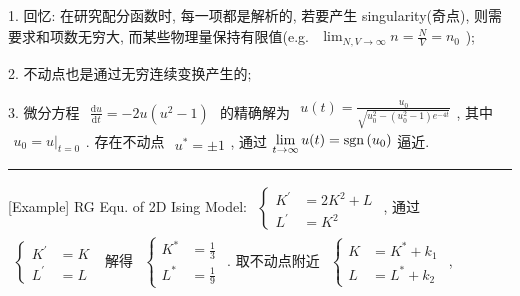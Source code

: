 \documentclass[../../main.tex]{subfiles}
\begin{document}
1. 回忆: 在研究配分函数时, 每一项都是解析的, 若要产生 singularity(奇点), 则需要求和项数无穷大, 而某些物理量保持有限值(e.g. $\begin{aligned}
    \lim_{N,V\rightarrow\infty}n = \frac{N}{V}= n_{0}
\end{aligned}$);

2. 不动点也是通过无穷连续变换产生的;

3. 微分方程 $\begin{aligned}
    \frac{\mathrm{d}u}{\mathrm{d}t} = -2u\left(u^{2}-1\right)
\end{aligned}$ 的精确解为 $\begin{aligned}
    u(t) = \frac{u_{0}}{\sqrt{u_{0}^{2}-(u_{0}^{2}-1)e^{-4t}}}
\end{aligned}$, 其中 $\begin{aligned}
    u_{0} = u\bigg|_{t=0}
\end{aligned}$. 存在不动点 $\begin{aligned}
    u^{*} = \pm 1
\end{aligned}$, 通过 $\begin{aligned}
    \lim_{t\rightarrow\infty}u(t) = \operatorname{sgn}{(u_{0})}
\end{aligned}$ 逼近. 

\vspace{0.5em}\hrule\vspace{0.5em}

[Example] RG Equ. of 2D Ising Model: $\begin{aligned}
    \left\{\begin{aligned}
        K^{\prime} &= 2K^{2} + L\\
        L^{\prime} &= K^{2}
    \end{aligned}\right.
\end{aligned}$, 通过 $\begin{aligned}
    \left\{\begin{aligned}
        K^{\prime} &= K\\
        L^{\prime} &= L
    \end{aligned}\right.
\end{aligned}$ 解得 $\begin{aligned}
    \left\{\begin{aligned}
        K^{*} &= \frac{1}{3}\\
        L^{*} &= \frac{1}{9}
    \end{aligned}\right.
\end{aligned}$. 取不动点附近 $\begin{aligned}
    \left\{\begin{aligned}
        K &= K^{*} + k_{1}\\
        L &= L^{*} + k_{2}
    \end{aligned}\right.
\end{aligned}$, 
\end{document}
